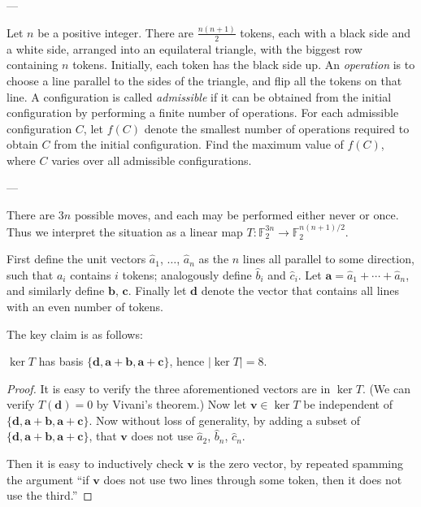 
---

Let $n$ be a positive integer. There are $\tfrac{n(n+1)}2$ tokens, each with a black side and a white side, arranged into an equilateral triangle, with the biggest row containing $n$ tokens. Initially, each token has the black side up. An \emph{operation} is to choose a line parallel to the sides of the triangle, and flip all the tokens on that line. A configuration is called \emph{admissible} if it can be obtained from the initial configuration by performing a finite number of operations. For each admissible configuration $C$, let $f(C)$ denote the smallest number of operations required to obtain $C$ from the initial configuration. Find the maximum value of $f(C)$, where $C$ varies over all admissible configurations.

---

There are $3n$ possible moves, and each may be performed either never or once. Thus we interpret the situation as a linear map $T:\mathbb F_2^{3n}\to\mathbb F_2^{n(n+1)/2}$.

First define the unit vectors $\hat a_1$, $\ldots$, $\hat a_n$ as the $n$ lines all parallel to some direction, such that $a_i$ contains $i$ tokens; analogously define $\hat b_i$ and $\hat c_i$. Let $\mathbf a=\hat a_1+\cdots+\hat a_n$, and similarly define $\mathbf b$, $\mathbf c$. Finally let $\mathbf d$ denote the vector that contains all lines with an even number of tokens.

The key claim is as follows:
\begin{claim*}
    $\ker T$ has basis $\{\mathbf d,\mathbf a+\mathbf b,\mathbf a+\mathbf c\}$, hence $\left\lvert\ker T\right\rvert=8$.
\end{claim*}
\begin{proof}
    It is easy to verify the three aforementioned vectors are in $\ker T$. (We can verify $T(\mathbf d)=0$ by Vivani's theorem.) Now let $\mathbf v\in\ker T$ be independent of $\{\mathbf d,\mathbf a+\mathbf b,\mathbf a+\mathbf c\}$.
    Now without loss of generality, by adding a subset of $\{\mathbf d,\mathbf a+\mathbf b,\mathbf a+\mathbf c\}$, that
    $\mathbf v$ does not use $\hat a_2$, $\hat b_n$, $\hat c_n$.

    Then it is easy to inductively check $\mathbf v$ is the zero vector, by repeated spamming the argument ``if $\mathbf v$ does not use two lines through some token, then it does not use the third.''
\end{proof}

